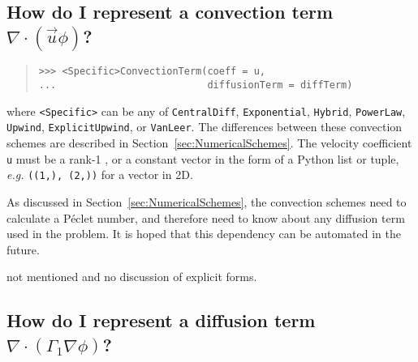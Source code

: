             \subsection{How do I represent a convection term
            $\nabla \cdot \left( \vec{u} \phi \right)$?}
            \hspace*{\fill}
            
            \begin{quote}
\begin{verbatim}
>>> <Specific>ConvectionTerm(coeff = u, 
...                          diffusionTerm = diffTerm)
\end{verbatim}
            \end{quote}
            where \verb|<Specific>| can be any of \verb|CentralDiff|,
            \verb|Exponential|, \verb|Hybrid|, \verb|PowerLaw|,
            \verb|Upwind|, \verb|ExplicitUpwind|, or \verb|VanLeer|.
            The differences between these convection schemes are described
            in Section~\ref{sec:NumericalSchemes}. The velocity coefficient 
            \verb|u| must be a rank-1 , or a 
            constant vector in the form of a Python list or tuple, 
            \emph{e.g.} \verb|((1,), (2,))| for a vector in 2D.
            
            \begin{reSTadmonition}[Note]
                As discussed in Section~\ref{sec:NumericalSchemes}, the
                convection schemes need to calculate a P\'eclet number,
                and therefore need to know about any diffusion term
                used in the problem.  It is hoped that this dependency
                can be automated in the future.
            \end{reSTadmonition}
            
            \begin{reSTadmonition}[Warning]
                 not mentioned and no discussion of
                explicit forms.
            \end{reSTadmonition}
        
            \subsection{How do I represent a diffusion term
            $\nabla \cdot \left( \Gamma_1 \nabla \phi \right)$?}
            \hspace*{\fill}
            
